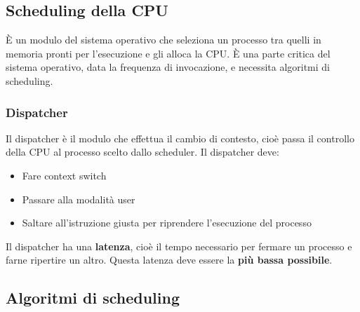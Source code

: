 \documentclass[a4paper]{article}
\begin{document}
\subsection{Scheduling della CPU}
È un modulo del sistema operativo che seleziona un processo tra quelli in memoria pronti
per l'esecuzione e gli alloca la CPU. È una parte critica del sistema operativo, data
la frequenza di invocazione, e necessita algoritmi di scheduling.

\subsubsection{Dispatcher}
Il dispatcher è il modulo che effettua il cambio di contesto, cioè passa il controllo
della CPU al processo scelto dallo scheduler. Il dispatcher deve:
\begin{itemize}
  \item Fare context switch
  \item Passare alla modalità user
  \item Saltare all'istruzione giusta per riprendere l'esecuzione del processo
\end{itemize}
Il dispatcher ha una \textbf{latenza}, cioè il tempo necessario per fermare un processo
e farne ripertire un altro. Questa latenza deve essere la \textbf{più bassa possibile}.


\subsection{Algoritmi di scheduling}
\end{document}
